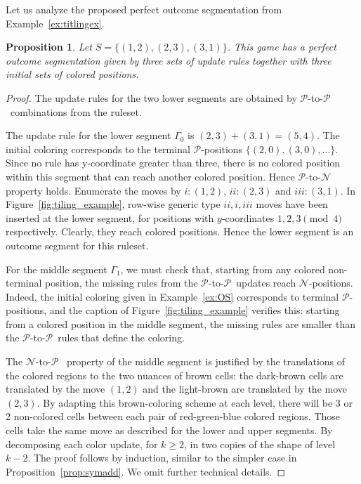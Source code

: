\documentclass{amsart}
\theoremstyle{plain}
\newtheorem{prop}[thm]{Proposition}
\theoremstyle{definition}
\newcommand{\N}{\ensuremath{\mathcal N}}
\renewcommand{\P}{\ensuremath{\mathcal P}}
\renewcommand{\ge}{\geqslant}
\begin{document}
Let us analyze the proposed perfect outcome segmentation from Example~\ref{ex:titlingex}.  
\begin{prop}\label{prop:OS}
    Let  $S =\{(1,2),(2,3),(3,1)\}$. This game has a perfect outcome segmentation given by three sets of update rules together with three initial sets of colored positions.
\end{prop}
\begin{proof}
    The update rules for the two lower segments are obtained by \P-to-\P\ combinations from the ruleset. %

    The update rule for the lower segment $\Gamma_0$ is $(2,3)+(3,1) = (5,4)$. The initial coloring corresponds to the terminal \P-positions $\{(2,0),(3,0),\ldots\}$. Since no rule has y-coordinate greater than three, there is no colored position within this segment that can reach another colored position. Hence \P-to-\N property holds. Enumerate the moves by $i:(1,2)$, $ii:(2,3)$ and $iii:(3,1)$. In Figure~\ref{fig:tiling_example}, row-wise generic type $ii, i, iii$ moves have been inserted at the lower segment, for positions with $y$-coordinates $1,2,3\pmod 4$ respectively. Clearly, they reach colored positions. 
    Hence the lower segment is an outcome segment for this ruleset.  

    For the middle segment $\Gamma_1$, we must check that, starting from any colored non-terminal position, the missing rules from the \P-to-\P\ updates reach \N-positions.  Indeed, the initial coloring given in Example~\ref{ex:OS} corresponds to terminal \P-positions, and the caption of Figure~\ref{fig:tiling_example} verifies this: starting from a colored position in the middle segment, the missing rules are smaller than the \P-to-\P\ rules that define the coloring. 
    
    The \N-to-\P~ property of the middle segment is justified by the translations of the colored regions to the two nuances of brown cells: the dark-brown cells are translated by the move $(1,2)$ and the light-brown are translated by the move $(2,3)$. By adapting this brown-coloring scheme at each level, there will be 3 or 2 non-colored cells between each pair of red-green-blue colored regions. Those cells take the same move as described for the lower and upper segments. By decomposing each color update, for $k\ge 2$, in two copies of the shape of level $k-2$. The proof follows by induction, similar to the simpler case in Proposition~\ref{prop:symadd}. We omit further technical details.


\end{proof}
\end{document}
